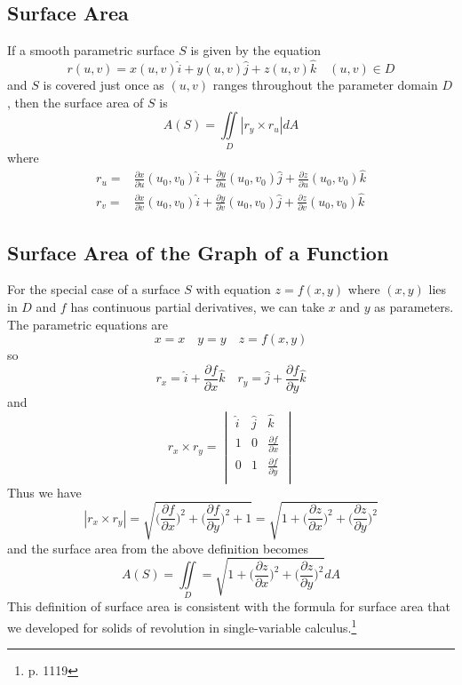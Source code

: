 \subsection{Surface Area}

If a smooth parametric surface $S$ is given by the equation $$r(u,v) = x(u,v)\hat{i} + y(u,v)\hat{j} + z(u,v)\hat{k} \quad (u,v) \in D$$ and $S$ is covered just once as $(u,v)$ ranges throughout the parameter domain $D$, then the surface area of $S$ is $$A(S) = \iint\limits_D |r_y \times r_u| dA$$ where $$\begin{aligned}
    r_u =&\frac{\partial x}{\partial u}(u_0, v_0)\hat{i} + \frac{\partial y}{\partial u}(u_0, v_0)\hat{j} + \frac{\partial z}{\partial u}(u_0, v_0)\hat{k}\\
    r_v =&\frac{\partial x}{\partial v}(u_0, v_0)\hat{i} + \frac{\partial y}{\partial v}(u_0, v_0)\hat{j} + \frac{\partial z}{\partial v}(u_0, v_0)\hat{k}
\end{aligned}$$

\subsection{Surface Area of the Graph of a Function}

For the special case of a surface $S$ with equation $z = f(x,y)$ where $(x,y)$ lies in $D$ and $f$ has continuous partial derivatives, we can take $x$ and $y$ as parameters. The parametric equations are $$x = x \quad y = y \quad z = f(x,y)$$ so $$r_x = \hat{i} + \frac{\partial f}{\partial x}\hat{k} \quad r_y = \hat{j} + \frac{\partial f}{\partial y}\hat{k}$$ and $$r_x \times r_y = \begin{vmatrix}
    \hat{i} & \hat{j}  & \hat{k} \\
    1       & 0        & \frac{\partial f}{\partial x} \\
    0       & 1        & \frac{\partial f}{\partial y} \\
\end{vmatrix}$$ Thus we have $$|r_x \times r_y| = \sqrt{\Big( \frac{\partial f}{\partial x} \Big)^2 + \Big( \frac{\partial f}{\partial y} \Big)^2 + 1} = \sqrt{1 + \Big( \frac{\partial z}{\partial x} \Big)^2 + \Big( \frac{\partial z}{\partial y} \Big)^2}$$ and the surface area from the above definition becomes $$A(S) = \iint\limits_D = \sqrt{1 + \Big( \frac{\partial z}{\partial x} \Big)^2 + \Big( \frac{\partial z}{\partial y} \Big)^2} dA$$ This definition of surface area is consistent with the formula for surface area that we developed for solids of revolution in single-variable calculus.\footnote{p. 1119}


